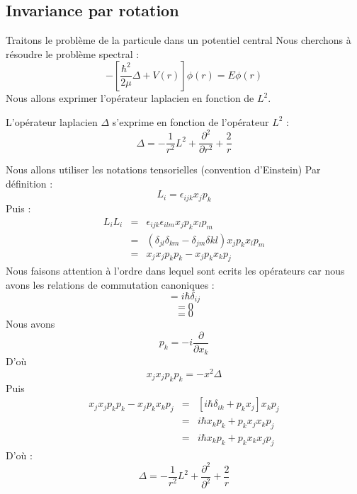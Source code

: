 \documentclass[12pt]{book}
\begin{document}
\subsection{Invariance par rotation}\label{secpotcent}
Traitons le probl\`eme de la particule dans un potentiel central
\cite{ph:mecaq:Cohen73,ma:equad:Dautray5,ph:elect:Jackson75}
Nous cherchons \`a r\'esoudre le probl\`eme spectral :
\begin{equation}
-[\frac{\hbar^2}{2\mu}\Delta+V(r)]\phi(r)=E\phi(r)
\end{equation}
Nous allons exprimer l'op\'erateur laplacien en fonction de $L^2$.
\begin{thm}
L'op\'erateur laplacien $\Delta$ s'exprime en fonction de
l'op\'erateur  $L^2$ :
\begin{equation}
\Delta=-\frac{1}{r^2}L^2+\frac{\partial^2}{\partial r^2}+\frac{2}{r}
\end{equation}
\end{thm}
\begin{pf}
Nous allons utiliser les notations tensorielles (convention d'Einstein)
Par d\'efinition :
\begin{equation}
L_i=\epsilon_{ijk}x_jp_k
\end{equation}
Puis :
\begin{eqnarray}
L_iL_i&=&\epsilon_{ijk}\epsilon_{ilm}x_{j}p_k x_l p_m\\
&=&(\delta_{jl}\delta_{km}-\delta_{jm}\delta{kl})x_{j}p_kx_l p_m\\
&=&x_jx_jp_kp_k-x_jp_kx_kp_j
\end{eqnarray}
Nous faisons attention \`a l'ordre dans lequel sont ecrits les
op\'erateurs car nous avons les relations de commutation canoniques :
\begin{equation}
[x_i,p_j]=i \hbar \delta_{ij}
\end{equation}
\begin{equation}
[x_j,x_k]=0
\end{equation}
\begin{equation}
[p_j,p_k]=0
\end{equation}
Nous avons 
\begin{equation}
p_k=-i\frac{\partial}{\partial x_k}
\end{equation}
D'o\`u
\begin{equation}
x_jx_jp_kp_k=-x^2\Delta
\end{equation}
Puis
\begin{eqnarray}
x_jx_jp_kp_k-x_jp_kx_kp_j&=&[i\hbar\delta_{ik}+p_kx_j]x_kp_j\\
&=&i\hbar x_kp_k+p_kx_jx_kp_j\\
&=&i\hbar x_kp_k+p_kx_kx_jp_j
\end{eqnarray}
D'o\`u :
\begin{equation}
\Delta=-\frac{1}{r^2}L^2+\frac{\partial^2}{\partial^2}+\frac{2}{r}
\end{equation}
\end{pf}
\end{document}
